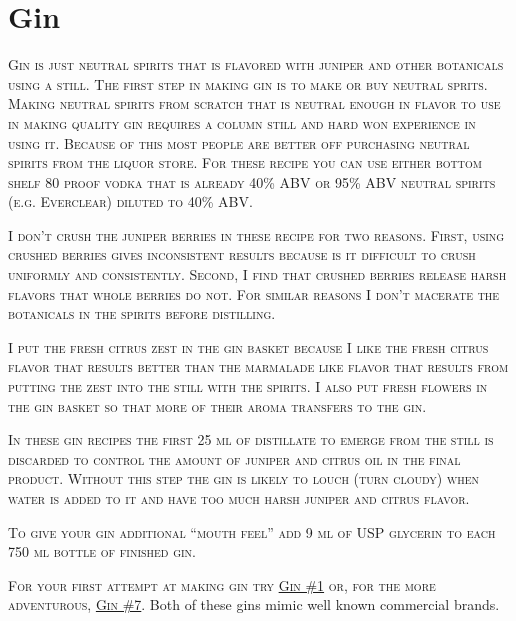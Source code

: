 \documentclass[letterpaper]{recipePMG}
\begin{document}
\chapter{Gin}


\textsc{Gin is just neutral spirits that is flavored with juniper and other botanicals using a still. The first step in making gin is to make or buy neutral sprits. Making neutral spirits from scratch that is neutral enough in flavor to use in making quality gin requires a column still and hard won experience in using it. Because of this most people are better off purchasing neutral spirits from the liquor store. For these recipe you can use either bottom shelf 80 proof vodka that is already 40\% ABV or 95\% ABV neutral spirits (e.g. Everclear) diluted to 40\% ABV.}

\textsc{I don't crush the juniper berries in these recipe for two reasons. First, using crushed berries gives inconsistent results because is it difficult to crush uniformly and consistently. Second, I find that crushed berries release harsh flavors that whole berries do not. For similar reasons I don't macerate the botanicals in the spirits before distilling.}

\textsc{I put the fresh citrus zest in the gin basket because I like the fresh citrus flavor that results better than the marmalade like flavor that results from putting the zest into the still with the spirits. I also put fresh flowers in the gin basket so that more of their aroma transfers to the gin.}

\textsc{In these gin recipes the first 25 ml of distillate to emerge from the still is discarded to control the amount of juniper and citrus oil in the final product.  Without this step the gin is likely to louch (turn cloudy) when water is added to it and have too much harsh juniper and citrus flavor. }

\textsc{To give your gin additional ``mouth feel'' add 9 ml of USP glycerin to each 750 ml bottle of finished gin.}

\textsc{For your first attempt at making gin try \hyperref[GinNumber1]{Gin \#1} or, for the more adventurous, \hyperref[GinNumber7]{Gin \#7}}. Both of these gins mimic well known commercial brands. 

\newpage

\label{GinNumber1}

\end{document}

